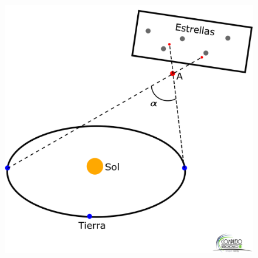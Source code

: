 \documentclass[10pt,a4paper]{article}
\begin{document}
\begin{figure}[H]
\centering
\includegraphics[scale=0.18]{Imagenes/Paralaje_01}
\end{figure}
\end{document}
